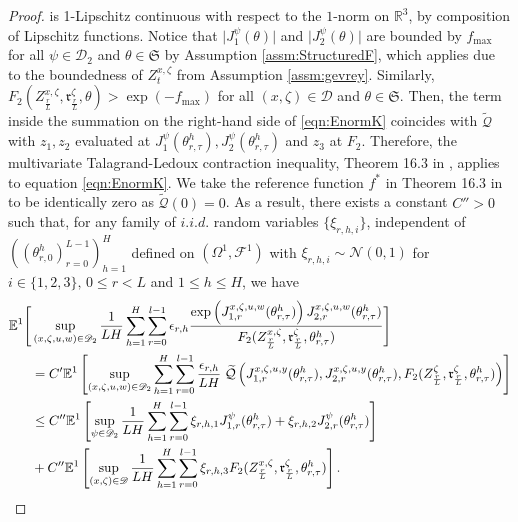 \documentclass{article}
\newcommand{\R}{\mathbb{R}}
\begin{document}
\begin{appendices}
\begin{proof}
is 1-Lipschitz continuous with respect to the $1$-norm on $\R^3$, by composition of Lipschitz functions. Notice that $\vert J_1^\psi(\theta)\vert$ and $\vert J_2^\psi(\theta)\vert$ are bounded by $f_\mathrm{max}$ for all $\psi\in \mathscr{D}_2$ and $\theta \in\mathfrak{S}$ by Assumption \ref{assm:StructuredF}, which applies due to the boundedness of $Z^{x,\zeta}_t$ from Assumption \ref{assm:gevrey}. Similarly, \\$F_2(Z^{x,\zeta}_\frac{r}{L},\mathfrak{r}^\zeta_\frac{r}{L}, \theta)>\exp(-f_{\mathrm{max}})$ for all $(x,\zeta)\in \mathscr{D}$ and $\theta \in \mathfrak{S}$. Then, the term inside the summation on the right-hand side of \eqref{eqn:EnormK} coincides with $\widetilde{\mathcal  Q}$ with $z_1,z_2$ evaluated at $J_1^{\psi}(\theta^h_{r,\tau}),J_2^\psi(\theta^h_{r,\tau})$ and $z_3$ at $F_2$. Therefore, the multivariate Talagrand-Ledoux contraction inequality, Theorem 16.3 in \cite{vandeGeer2016}, applies to equation \eqref{eqn:EnormK}. We take the reference function $f^*$ in Theorem 16.3 in \cite{vandeGeer2016} to be identically zero as $\widetilde{\mathcal Q}(0)=0$. As a result, there exists a constant $C''>0$ such that, for any family of $i.i.d.$ random variables $\{\xi_{r,h,i}\}$, independent of $((\theta_{r,0}^h)_{r=0}^{L-1})_{h=1}^H$ defined on $(\Omega^1,\mathcal F^1)$ with $\mathcal \xi_{r,h,i}\sim \mathcal N(0,1)$ for $i\in\{ 1,2,3\},\,0\le r <L$ and $1\le h\le H$, we have 
    \begin{align}
           \mathbb E^1\Bigg[& \sup_{(x,\zeta,u,w)\in \mathscr D_2}\frac{1}{LH}\sum_{h=1}^H\sum_{r=0}^{l-1}\epsilon_{r,h}\frac{ \exp\left(J^{x,\zeta,u,w}_{1,r}(\theta^h_{r,\tau})\right) J^{x,\zeta,u,w}_{2,r}(\theta^h_{r,\tau})}{F_2(Z^{x,\zeta}_\frac{r}{L},\mathfrak{r}^{\zeta}_\frac{r}{L},\theta^h_{r,\tau})}\Bigg]\notag\\&=  C' \mathbb E^1\left[ \sup_{(x,\zeta,u,w)\in \mathscr D_2}\sum_{h=1}^H\sum_{r=0}^{l-1}\frac{\epsilon_{r,h}}{LH}\; \widetilde{\mathcal{Q}}\left(J^{x,\zeta,u,y}_{1,r}(\theta^h_{r,\tau}), J^{x,\zeta,u,y}_{2,r}(\theta^h_{r,\tau}),F_2(Z^{\zeta}_\frac{r}{L},\mathfrak{r}^{\zeta}_\frac{r}{L},\theta^h_{r,\tau})\right)\right]\notag\\&\le C''\mathbb E^1\left[\sup_{\psi \in \mathscr D_2}\frac{1}{LH}\sum_{h=1}^H\sum_{r=0}^{l-1} \xi_{r,h,1} J^{\psi}_{1,r}(\theta^h_{r,\tau}) +  \xi_{r,h,2}J^{\psi}_{2,r}(\theta^h_{r,\tau}) \right]\notag\\& +C''\mathbb E^1\left[\sup_{(x,\zeta)\in \mathscr D}\frac{1}{LH}\sum_{h=1}^H\sum_{r=0}^{l-1}\xi_{r,h,3} F_2(Z^{x,\zeta}_\frac{r}{L},\mathfrak{r}^{\zeta}_\frac{r}{L},\theta^h_{r,\tau})\right].\label{eqn:J4}

\end{align}
\end{proof}
\end{appendices}
\end{document}
